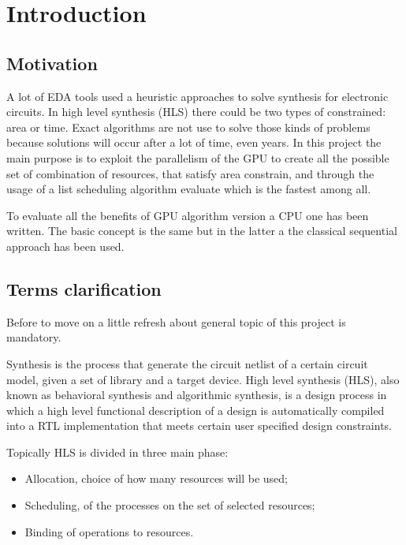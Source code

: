 %
\chapter{Introduction}
\label{chap1}

\section{Motivation}
A lot of EDA tools used a heuristic approaches to solve synthesis for electronic circuits. In high level synthesis (HLS) there could be two types of constrained: area or time. Exact algorithms are not use to solve those kinds of problems because solutions will occur after a lot of time, even years. In this project the main purpose is to exploit the parallelism of the GPU to create all the possible set of combination of resources, that satisfy area constrain, and through the usage of a list scheduling algorithm evaluate which is the fastest among all.

To evaluate all the benefits of GPU algorithm version a CPU one has been written. The basic concept is the same but in the latter a the classical sequential approach has been used.

\section{Terms clarification}

Before to move on a little refresh about general topic of this project is mandatory.

Synthesis is the process that generate the circuit netlist of a certain circuit model, given a set of library and a target device. High level synthesis (HLS), also known as behavioral synthesis and algorithmic synthesis, is a design process in which a high level functional description of a design is automatically compiled into a RTL implementation that meets certain user specified design constraints. 

Topically HLS is divided in three main phase:

\begin{itemize}
    \item Allocation, choice of how many resources will be used;
    \item Scheduling, of the processes on the set of selected resources;
    \item Binding of operations to resources.
\end{itemize}{}

